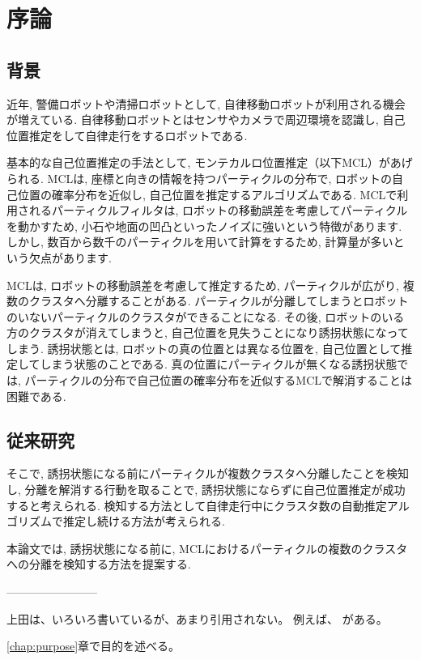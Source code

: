 \chapter{序論}
\section{背景}
近年, 警備ロボットや清掃ロボットとして, 自律移動ロボットが利用される機会が増えている. 
自律移動ロボットとはセンサやカメラで周辺環境を認識し, 自己位置推定をして自律走行をするロボットである. 

基本的な自己位置推定の手法として, モンテカルロ位置推定（以下MCL）があげられる. 
MCLは, 座標と向きの情報を持つパーティクルの分布で, ロボットの自己位置の確率分布を近似し, 自己位置を推定するアルゴリズムである.
MCLで利用されるパーティクルフィルタは, ロボットの移動誤差を考慮してパーティクルを動かすため, 小石や地面の凹凸といったノイズに強いという特徴があります. 
しかし, 数百から数千のパーティクルを用いて計算をするため, 計算量が多いという欠点があります.

MCLは, ロボットの移動誤差を考慮して推定するため, パーティクルが広がり, 複数のクラスタへ分離することがある. 
パーティクルが分離してしまうとロボットのいないパーティクルのクラスタができることになる. 
その後, ロボットのいる方のクラスタが消えてしまうと, 自己位置を見失うことになり誘拐状態になってしまう. 
誘拐状態とは, ロボットの真の位置とは異なる位置を, 自己位置として推定してしまう状態のことである.
真の位置にパーティクルが無くなる誘拐状態では, パーティクルの分布で自己位置の確率分布を近似するMCLで解消することは困難である. 


\section{従来研究}


そこで, 誘拐状態になる前にパーティクルが複数クラスタへ分離したことを検知し, 分離を解消する行動を取ることで, 誘拐状態にならずに自己位置推定が成功すると考えられる. 
検知する方法として自律走行中にクラスタ数の自動推定アルゴリズムで推定し続ける方法が考えられる. 

本論文では, 誘拐状態になる前に, MCLにおけるパーティクルの複数のクラスタへの分離を検知する方法を提案する. 









------------------------


上田は、いろいろ書いているが、あまり引用されない。
例えば、\cite{上田2015gihyo,ueda2015,上田2015jsai}
がある。

\ref{chap:purpose}章で目的を述べる。

%
